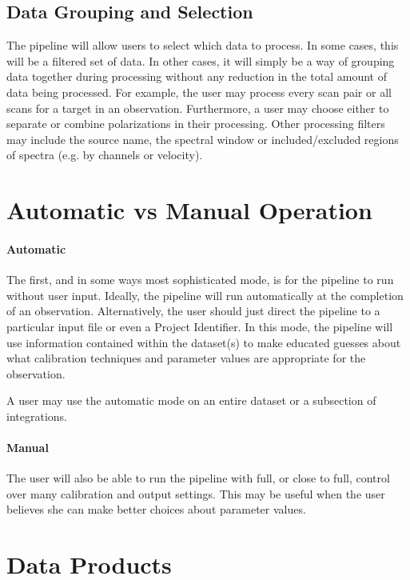 \subsection{Data Grouping and Selection}

The pipeline will allow users to select which data to process.  In some cases, this will be a filtered set of data.  In other cases, it will simply be a way of grouping data together during processing without any reduction in the total amount of data being processed.  For example, the user may process every scan pair or all scans for a target in an observation.  Furthermore, a user may choose either to separate or combine polarizations in their processing.  Other processing filters may include the source name, the spectral window or included/excluded regions of spectra (e.g. by channels or velocity).

\section{Automatic vs Manual Operation}

\paragraph{Automatic}

The first, and in some ways most sophisticated mode, is for the pipeline to run without user input.  Ideally, the pipeline will run automatically at the completion of an observation.  Alternatively, the user should just direct the pipeline to a particular input file or even a Project Identifier.  In this mode, the pipeline will use information contained within the dataset(s) to make educated guesses about what calibration techniques and parameter values are appropriate for the observation.

A user may use the automatic mode on an entire dataset or a subsection of integrations.

\paragraph{Manual}

The user will also be able to run the pipeline with full, or close to full, control over many calibration and output settings.  This may be useful when the user believes she can make better choices about parameter values.

\section{Data Products}

